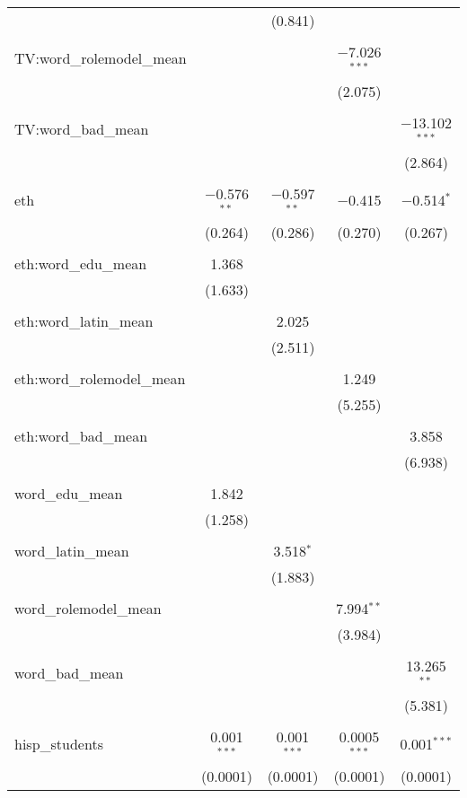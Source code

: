 \begin{table}[!htbp]
\begin{tabular}{@{\extracolsep{-2pt}}lcccc}
  &  & (0.841) &  &  \\ 
  & & & & \\ 
 TV:word\_rolemodel\_mean &  &  & $-$7.026$^{***}$ &  \\ 
  &  &  & (2.075) &  \\ 
  & & & & \\ 
 TV:word\_bad\_mean &  &  &  & $-$13.102$^{***}$ \\ 
  &  &  &  & (2.864) \\ 
  & & & & \\ 
 eth & $-$0.576$^{**}$ & $-$0.597$^{**}$ & $-$0.415 & $-$0.514$^{*}$ \\ 
  & (0.264) & (0.286) & (0.270) & (0.267) \\ 
  & & & & \\ 
 eth:word\_edu\_mean & 1.368 &  &  &  \\ 
  & (1.633) &  &  &  \\ 
  & & & & \\ 
 eth:word\_latin\_mean &  & 2.025 &  &  \\ 
  &  & (2.511) &  &  \\ 
  & & & & \\ 
 eth:word\_rolemodel\_mean &  &  & 1.249 &  \\ 
  &  &  & (5.255) &  \\ 
  & & & & \\ 
 eth:word\_bad\_mean &  &  &  & 3.858 \\ 
  &  &  &  & (6.938) \\ 
  & & & & \\ 
 word\_edu\_mean & 1.842 &  &  &  \\ 
  & (1.258) &  &  &  \\ 
  & & & & \\ 
 word\_latin\_mean &  & 3.518$^{*}$ &  &  \\ 
  &  & (1.883) &  &  \\ 
  & & & & \\ 
 word\_rolemodel\_mean &  &  & 7.994$^{**}$ &  \\ 
  &  &  & (3.984) &  \\ 
  & & & & \\ 
 word\_bad\_mean &  &  &  & 13.265$^{**}$ \\ 
  &  &  &  & (5.381) \\ 
  & & & & \\ 
 hisp\_students & 0.001$^{***}$ & 0.001$^{***}$ & 0.0005$^{***}$ & 0.001$^{***}$ \\ 
  & (0.0001) & (0.0001) & (0.0001) & (0.0001) \\ 

\end{tabular}
\end{table}
